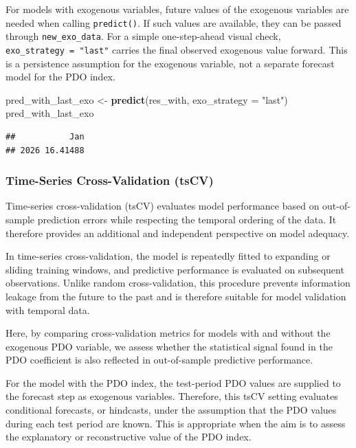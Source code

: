 \documentclass[
]{article}
\newenvironment{Shaded}{\begin{snugshade}}{\end{snugshade}}
\newcommand{\AttributeTok}[1]{\textcolor[rgb]{0.13,0.29,0.53}{#1}}
\newcommand{\FunctionTok}[1]{\textcolor[rgb]{0.13,0.29,0.53}{\textbf{#1}}}
\newcommand{\NormalTok}[1]{#1}
\newcommand{\OtherTok}[1]{\textcolor[rgb]{0.56,0.35,0.01}{#1}}
\newcommand{\StringTok}[1]{\textcolor[rgb]{0.31,0.60,0.02}{#1}}
\begin{document}
For models with exogenous variables, future values of the exogenous
variables are needed when calling \texttt{predict()}. If such values are
available, they can be passed through \texttt{new\_exo\_data}. For a
simple one-step-ahead visual check, \texttt{exo\_strategy\ =\ "last"}
carries the final observed exogenous value forward. This is a
persistence assumption for the exogenous variable, not a separate
forecast model for the PDO index.

\begin{Shaded}
\begin{Highlighting}[]
\NormalTok{pred\_with\_last\_exo }\OtherTok{\textless{}{-}} \FunctionTok{predict}\NormalTok{(res\_with, }\AttributeTok{exo\_strategy =} \StringTok{"last"}\NormalTok{)}
\NormalTok{pred\_with\_last\_exo}
\end{Highlighting}
\end{Shaded}

\begin{verbatim}
##           Jan
## 2026 16.41488
\end{verbatim}

\subsubsection{Time-Series Cross-Validation
(tsCV)}\label{time-series-cross-validation-tscv}

Time-series cross-validation (tsCV) evaluates model performance based on
out-of-sample prediction errors while respecting the temporal ordering
of the data. It therefore provides an additional and independent
perspective on model adequacy.

In time-series cross-validation, the model is repeatedly fitted to
expanding or sliding training windows, and predictive performance is
evaluated on subsequent observations. Unlike random cross-validation,
this procedure prevents information leakage from the future to the past
and is therefore suitable for model validation with temporal data.

Here, by comparing cross-validation metrics for models with and without
the exogenous PDO variable, we assess whether the statistical signal
found in the PDO coefficient is also reflected in out-of-sample
predictive performance.

For the model with the PDO index, the test-period PDO values are
supplied to the forecast step as exogenous variables. Therefore, this
tsCV setting evaluates conditional forecasts, or hindcasts, under the
assumption that the PDO values during each test period are known. This
is appropriate when the aim is to assess the explanatory or
reconstructive value of the PDO index.
\end{document}
